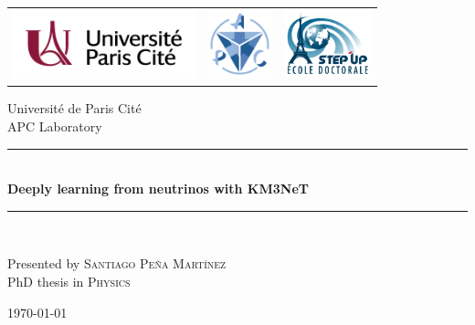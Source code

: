 \documentclass[12pt]{book}
\newcommand{\HRule}{\rule{\linewidth}{0.7mm}}
\newcommand{\Hrule}{\rule{\linewidth}{0.3mm}}
\begin{document}
	
	\begin{titlepage}
		\begin{center}
			\begin{tabular}{c@{\hskip 1cm}c@{\hskip 3cm}c}
				\includegraphics[height=2cm]{images/UniversiteParisCite_logo_horizontal_couleur_RVB.png} &
				\includegraphics[height=2cm]{images/logoAPC.png}&
				\includegraphics[height=2cm]{images/EDSTEPUP.pdf}\\
			\end{tabular}
		\end{center}
	
		
		\begin{center}

			Université de Paris Cité\\
			APC Laboratory
  
  			\vfill
  			
	 		\HRule \\[0.1cm]
	 		 { \Large \bfseries Deeply learning  from neutrinos with KM3NeT	 }
	  		\Hrule \\
		
		\end{center}
		
		\vfill
			
		\begin{center}
			Presented by \textsc{\Large Santiago Peña Martínez}\\[1cm] 
			PhD thesis in \textsc{\large Physics}\\[1cm]
		
	
			
			\vspace{1cm}
	
			\today
		\end{center}
		
		\vspace{1cm}
			

\end{titlepage}
\end{document}
